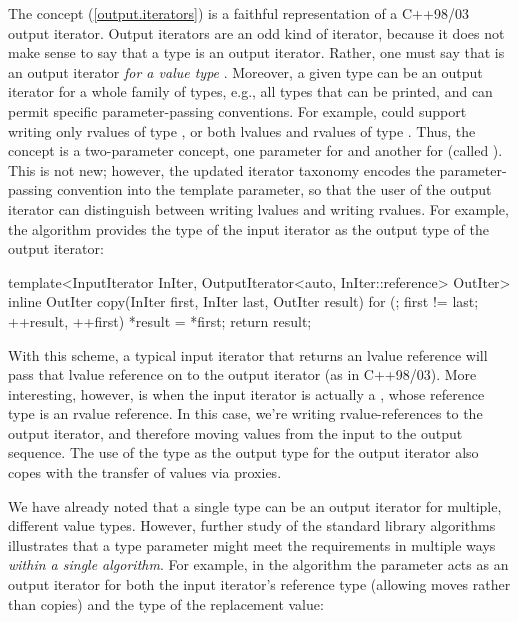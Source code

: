 \documentclass[american,twoside]{book}
\begin{document}
\begin{titlepage}
The  concept (\ref{output.iterators}) is a
faithful representation of a C++98/03 output iterator. Output
iterators are an odd kind of iterator, because it does not make sense
to say that a type  is an output iterator. Rather, one must
say that  is an output iterator \textit{for a value type
  }. Moreover, a given type  can be an output
iterator for a whole family of types, e.g., all types that can be
printed, and can permit specific parameter-passing conventions. For
example,  could support writing only rvalues of type
, or both lvalues and rvalues of type . Thus, the
 concept is a two-parameter concept, one
parameter for  and another for  (called
). This is not new; however, the updated iterator
taxonomy encodes the parameter-passing convention into the
 template parameter, so that the user of the output
iterator can distinguish between writing lvalues and writing
rvalues. For example, the  algorithm provides the
 type of the input iterator as the output type of the
output iterator:

\begin{codeblock}
template<InputIterator InIter, 
         OutputIterator<auto, InIter::reference> OutIter>
  inline OutIter
  copy(InIter first, InIter last, OutIter result)
  {
    for (; first != last; ++result, ++first)
      *result = *first;
    return result;
  }
\end{codeblock}
  
With this scheme, a typical input iterator that returns an lvalue
reference will pass that lvalue reference on to the output iterator
(as in C++98/03). More interesting, however, is when the input
iterator is actually a , whose reference type is
an rvalue reference. In this case, we're writing rvalue-references to
the output iterator, and therefore moving values from the input to the
output sequence. The use of the  type as the output
type for the output iterator also copes with the transfer of values
via proxies.

We have already noted that a single type  can be an output
iterator for multiple, different value types. However, further study
of the standard library algorithms illustrates that a type parameter
might meet the  requirements in multiple ways
\textit{within a single algorithm}. For example, in the
 algorithm the  parameter acts as
an output iterator for both the input iterator's reference type
(allowing moves rather than copies) and the type of the replacement
value:


\end{titlepage}
\end{document}
